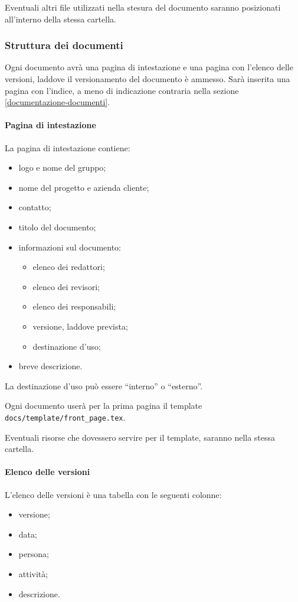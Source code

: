 \documentclass[a4paper, 12pt]{article}
\begin{document}
Eventuali altri file utilizzati nella stesura del documento saranno posizionati all'interno della stessa cartella.

\subsubsection{Struttura dei documenti}
Ogni documento avrà una pagina di intestazione e una pagina con l'elenco delle versioni, laddove il versionamento del documento è ammesso.
Sarà inserita una pagina con l'indice, a meno di indicazione contraria nella sezione \ref{documentazione-documenti}.

\paragraph{Pagina di intestazione}
La pagina di intestazione contiene:
\begin{itemize}
\item logo e nome del gruppo;
\item nome del progetto e azienda cliente;
\item contatto;
\item titolo del documento;
\item informazioni sul documento:
\begin{itemize}
	\item elenco dei redattori;
	\item elenco dei revisori;
	\item elenco dei responsabili;
	\item versione, laddove prevista;
	\item destinazione d'uso;
\end{itemize}
\item breve descrizione.
\end{itemize}

La destinazione d'uso può essere ``interno'' o ``esterno''.

Ogni documento userà per la prima pagina il template \texttt{docs/template/front\_page.tex}.

Eventuali risorse che dovessero servire per il template, saranno nella stessa cartella.

\paragraph{Elenco delle versioni}
L'elenco delle versioni è una tabella con le seguenti colonne:
\begin{itemize}
\item versione;
\item data;
\item persona;
\item attività;
\item descrizione.
\end{itemize}
\end{document}
